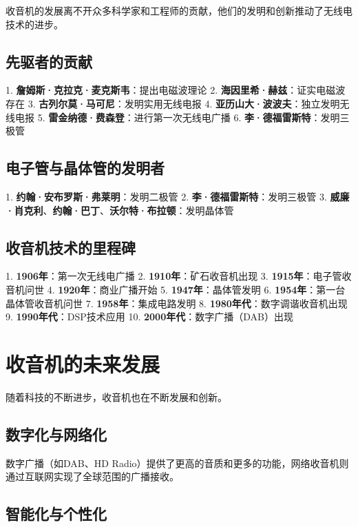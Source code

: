 \documentclass[12pt,UTF8]{ctexbook}
\begin{document}
收音机的发展离不开众多科学家和工程师的贡献，他们的发明和创新推动了无线电技术的进步。

\section{先驱者的贡献}

1. \textbf{詹姆斯·克拉克·麦克斯韦}：提出电磁波理论
2. \textbf{海因里希·赫兹}：证实电磁波存在
3. \textbf{古列尔莫·马可尼}：发明实用无线电报
4. \textbf{亚历山大·波波夫}：独立发明无线电报
5. \textbf{雷金纳德·费森登}：进行第一次无线电广播
6. \textbf{李·德福雷斯特}：发明三极管

\section{电子管与晶体管的发明者}

1. \textbf{约翰·安布罗斯·弗莱明}：发明二极管
2. \textbf{李·德福雷斯特}：发明三极管
3. \textbf{威廉·肖克利}、\textbf{约翰·巴丁}、\textbf{沃尔特·布拉顿}：发明晶体管

\section{收音机技术的里程碑}

1. \textbf{1906年}：第一次无线电广播
2. \textbf{1910年}：矿石收音机出现
3. \textbf{1915年}：电子管收音机问世
4. \textbf{1920年}：商业广播开始
5. \textbf{1947年}：晶体管发明
6. \textbf{1954年}：第一台晶体管收音机问世
7. \textbf{1958年}：集成电路发明
8. \textbf{1980年代}：数字调谐收音机出现
9. \textbf{1990年代}：DSP技术应用
10. \textbf{2000年代}：数字广播（DAB）出现

\chapter{收音机的未来发展}

随着科技的不断进步，收音机也在不断发展和创新。

\section{数字化与网络化}

数字广播（如DAB、HD Radio）提供了更高的音质和更多的功能，网络收音机则通过互联网实现了全球范围的广播接收。

\section{智能化与个性化}
\end{document}

